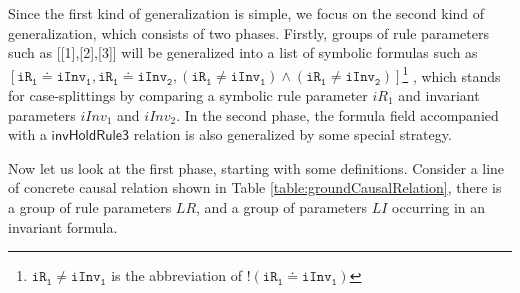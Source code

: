 \documentclass{llncs}
\def \eqc {\doteq }
\def \iInv {iInv}
\def \iR {iR}
\begin{document}
Since the first kind of generalization is simple, we focus on the second kind of generalization, which consists of two phases.
Firstly, groups of rule parameters  such as [[1],[2],[3]] will be generalized into a list of  symbolic formulas  such as $[\mathtt{\iR_1} \eqc \mathtt{\iInv_1},\mathtt{\iR_1} \eqc \mathtt{\iInv_2},  (\mathtt{\iR_1} \ne \mathtt{\iInv_1}) \wedge  (\mathtt{\iR_1} \ne \mathtt{\iInv_2})] $\footnote{$\mathtt{\iR_1} \ne \mathtt{\iInv_1}$ is the abbreviation of $!(\mathtt{\iR_1} \eqc \mathtt{\iInv_1})$} , which  stands for case-splittings  by comparing  a symbolic rule parameter $iR_1$ and invariant parameters $\iInv_1$ and $\iInv_2$. In the second phase, the formula field accompanied with a $\mathsf{invHoldRule3}$ relation is also  generalized by some special strategy.  %

Now let us look at the first phase, starting with some definitions.
Consider a line of concrete causal relation shown in Table \ref{table:groundCausalRelation}, there is a group of rule parameters $LR$, and a group of parameters $LI$ occurring in an  invariant formula.
\end{document}
